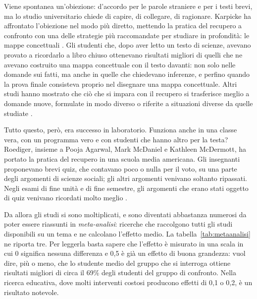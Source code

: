 Viene spontanea un'obiezione: d'accordo per le parole straniere e per i
testi brevi, ma lo studio universitario chiede di capire, di collegare,
di ragionare. Karpicke ha affrontato l'obiezione nel modo più diretto,
mettendo la pratica del recupero a confronto con una delle strategie
più raccomandate per studiare in profondità: le mappe concettuali
\parencite{karpicke2011}. Gli studenti che, dopo aver letto un testo di
scienze, avevano provato a ricordarlo a libro chiuso ottenevano
risultati migliori di quelli che ne avevano costruito una mappa
concettuale con il testo davanti: non solo nelle domande sui fatti, ma
anche in quelle che chiedevano inferenze, e perfino quando la prova
finale consisteva proprio nel disegnare una mappa concettuale. Altri
studi hanno mostrato che ciò che si impara con il recupero si trasferisce
meglio a domande nuove, formulate in modo diverso o riferite a situazioni
diverse da quelle studiate \parencite{butler2010}.

Tutto questo, però, era successo in laboratorio. Funziona anche in una
classe vera, con un programma vero e con studenti che hanno altro per la
testa? Roediger, insieme a Pooja Agarwal, Mark McDaniel e Kathleen
McDermott, ha portato la pratica del recupero in una scuola media
americana. Gli insegnanti proponevano brevi quiz, che contavano poco o
nulla per il voto, su una parte degli argomenti di scienze sociali; gli
altri argomenti venivano soltanto ripassati.
Negli esami di fine unità e di fine semestre, gli argomenti che erano
stati oggetto di quiz venivano ricordati molto meglio
\parencite{roediger2011}.

Da allora gli studi si sono moltiplicati, e sono diventati abbastanza
numerosi da poter essere riassunti in \emph{meta-analisi}: ricerche che
raccolgono tutti gli studi disponibili su un tema e ne calcolano
l'effetto medio. La tabella~\ref{tab:metaanalisi} ne riporta tre. Per
leggerla basta sapere che l'effetto è misurato in una scala in cui 0
significa nessuna differenza e 0,5 è già un effetto di buona grandezza:
vuol dire, più o meno, che lo studente medio del gruppo che si
interroga ottiene risultati migliori di circa il 69\% degli studenti
del gruppo di confronto. Nella ricerca educativa, dove molti interventi
costosi producono effetti di 0,1 o 0,2, è un risultato notevole.

